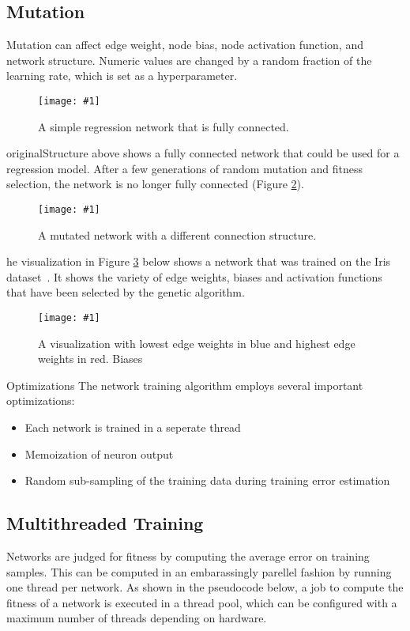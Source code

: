 \documentclass[twocolumn]{article}
\newcommand\fig[5]{
	\begin{figure}[H]
		\begin{center}\texttt{[image: \#1]}\end{center}
		\caption{#4}\label{fig:#2}
	\end{figure}
}
\newcommand\figRef[1]{Figure \ref{fig:#1}\xspace}
\begin{document}
\subsection{Mutation}

Mutation can affect edge weight, node bias, node activation function, and network structure. Numeric values are changed by a random fraction of the learning rate, which is set as a hyperparameter. 

\fig{images/originalRegression.png}{originalStructure}{0.2}{
A simple regression network that is fully connected.
}

\figRef{originalStructure} above shows a fully connected network that could be used for a regression model. After a few generations of random mutation and fitness selection, the network is no longer fully connected (\figRef{mutatedStructure}).

\fig{images/mutatedRegression.png}{mutatedStructure}{0.2}{
A mutated network with a different connection structure.
}

The visualization in \figRef{enhancedVis} below shows a network that was trained on the Iris dataset~\cite{IrisDataset}. It shows the variety of edge weights, biases and activation functions that have been selected by the genetic algorithm.

\fig{images/enhancedVisualization.png}{enhancedVis}{0.2}{
A visualization with lowest edge weights in blue and highest edge weights in red. Biases 
}

\section{Optimizations}
The network training algorithm employs several important optimizations:

\begin{itemize}
 	\item Each network is trained in a seperate thread
	\item Memoization of neuron output  
	\item Random sub-sampling of the training data during training error estimation 
\end{itemize}

\subsection{Multithreaded Training}

Networks are judged for fitness by computing the average error on training samples. This can be computed in an embarassingly parellel fashion by running one thread per network. As shown in the pseudocode below, a job to compute the fitness of a network is executed in a thread pool, which can be configured with a maximum number of threads depending on hardware.
\end{document}
